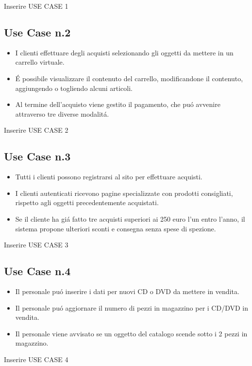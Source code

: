 \documentclass[a4paper,titlepage]{book}
\begin{document}
Inserire USE CASE 1

\subsection{Use Case n.2}
\begin{itemize}
\item I clienti effettuare degli acquisti selezionando gli oggetti da mettere in un carrello virtuale.
\item \'E possibile visualizzare il contenuto del carrello, modificandone il contenuto, aggiungendo o togliendo alcuni articoli.
\item Al termine dell'acquisto viene gestito il pagamento, che pu\'o avvenire attraverso tre diverse modalit\'a.
\end{itemize}

Inserire USE CASE 2

\subsection{Use Case n.3}
\begin{itemize}
\item Tutti i clienti possono registrarsi al sito per effettuare acquisti.
\item I clienti autenticati ricevono pagine specializzate con prodotti consigliati, rispetto agli oggetti precedentemente acquistati.
\item Se il cliente ha gi\'a fatto tre acquisti superiori ai 250 euro l'un entro l'anno, il sistema propone ulteriori sconti e consegna senza spese di spezione.
\end{itemize}

Inserire USE CASE 3

\subsection{Use Case n.4}
\begin{itemize}
\item Il personale pu\'o inserire i dati per nuovi CD o DVD da mettere in vendita.
\item Il personale pu\'o aggiornare il numero di pezzi in magazzino per i CD/DVD in vendita.
\item Il personale viene avvisato se un oggetto del catalogo scende sotto i 2 pezzi in magazzino.
\end{itemize}

Inserire USE CASE 4
\end{document}
